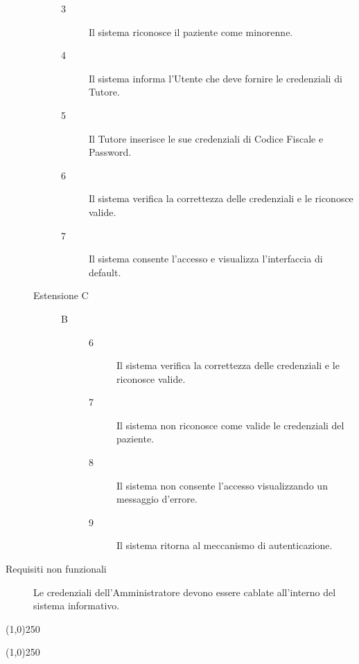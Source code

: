 \begin{description}
\begin{description}
	\begin{description}
	\item[3]
	Il sistema riconosce il paziente come minorenne.
	\item[4]
	Il sistema informa l'Utente che deve fornire le credenziali di Tutore.
	\item[5]
	Il Tutore inserisce le sue credenziali di Codice Fiscale e Password.
	\item[6]
	Il sistema verifica la correttezza delle credenziali e le riconosce valide.
	\item[7] 
	Il sistema consente l'accesso e visualizza l'interfaccia di default.
	\end{description}
	
\end{description}

\begin{description}
	\item[Estensione C]
	\medskip
	\begin{description}
	\item[B]
	\begin{description}
	\item[6]
	Il sistema verifica la correttezza delle credenziali e le riconosce valide.
	\item[7] 
	Il sistema non riconosce come valide le credenziali del paziente.
	\item[8]
	Il sistema non consente l'accesso visualizzando un messaggio d'errore.
	\item[9]
	Il sistema ritorna al meccanismo di autenticazione.
	\end{description}
	\end{description}
	
\end{description}


\item[Requisiti non funzionali]
\begin{itemize}
\diam  Le credenziali dell'Amministratore devono essere cablate all'interno del
	sistema informativo.
\end{itemize}
\end{description}

\begin{center}
\line(1,0){250}
\end{center}

\begin{center}
\line(1,0){250}
\end{center}

